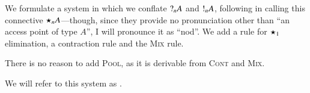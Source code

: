 \documentclass[twocolumn]{article}
\begin{document}
We formulate a system in which we conflate $\give[n]{A}$ and $\take[n]{A}$,
following \citet{atkey2016} in calling this connective $\nod[n]{A}$---though,
since they provide no pronunciation other than ``an access point of type $A$'',
I will pronounce it as ``nod''.
We add a rule for $\nod[1]{}$ elimination, a contraction rule and the
\textsc{Mix} rule.
\begin{center}
  \begin{proofbox}
    \SYM{\nod{}}
  \end{proofbox}
  \begin{proofbox}
  \end{proofbox}
\end{center}
There is no reason to add \textsc{Pool}, as it is derivable from \textsc{Cont}
and \textsc{Mix}.
\begin{proofblock}
\end{proofblock}
We will refer to this system as \ndcp.
\end{document}
